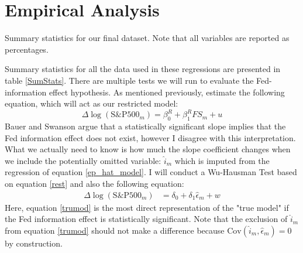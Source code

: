 \documentclass[a4paper,man,floatsintext,natbib]{apa6}
\begin{document}
	\section{Empirical Analysis}
	\begin{table}
		\centering
		
		\caption{Summary statistics for our final dataset. Note that all variables are reported as percentages.}
		\label{SumStats}
	\end{table}
	Summary statistics for all the data used in these regressions are presented in table \ref{SumStats}. There are multiple tests we will run to evaluate the Fed-information effect hypothesis. As mentioned previously, \cite{Bauer2020} estimate the following equation, which will act as our restricted model:
	\[
	\Delta \log{(\text{S\&P500}_m)} = \beta^R_0 + \beta^R_1 FS_m + u \tag{6} \label{rest}
	\]
	Bauer and Swanson argue that a statistically significant slope implies that the Fed information effect does not exist, however I disagree with this interpretation. What we actually need to know is how much the slope coefficient changes when we include the potentially omitted variable: \(\hat{i}_m\) which is imputed from the regression of equation \ref{ep_hat_model}. I will conduct a Wu-Hausman Test based on equation \ref{rest} and also the following equation:
	\begin{align*}
		\Delta \log{(\text{S\&P500}_m)} &= \delta_0 + \delta_1 \hat{\epsilon}_m + w \tag{8} \label{trumod}
	\end{align*}
	Here, equation \ref{trumod} is the most direct representation of the "true model" if the Fed information effect is statistically significant. Note that the exclusion of \(\hat{i}_m\) from equation \ref{trumod} should not make a difference because \(\mathrm{Cov}(\hat{i}_m, \hat{\epsilon}_m) = 0\) by construction.
\end{document}
